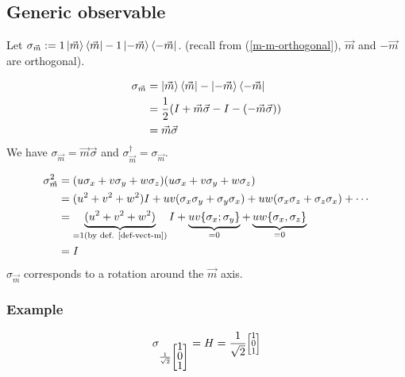 \documentclass{article}
\newcommand{\colvec}[2][.8]{%
  \scalebox{#1}{%
    \renewcommand{\arraystretch}{.7}%
    $\begin{bmatrix}#2\end{bmatrix}$%
  } }
\begin{document}
\subsection{Generic observable}
Let
$\sigma_{\vec{m}}:=1\ket{\vec{m}}\bra{\vec{m}}-1\ket{-\vec{m}}\bra{-\vec{m}}$.
(recall from (\ref{m-m-orthogonal}), $\vec{m}$ and $-\vec{m}$ are orthogonal).

\begin{equation}
    \begin{aligned}
        \sigma_{\vec{m}}
            & = \ket{\vec{m}}\bra{\vec{m}}-\ket{-\vec{m}}\bra{-\vec{m}} \\
            & = \frac{1}{2}(I+\vec{m}\vec{\sigma}-I-(-\vec{m}\vec{\sigma})) \\
            & = \vec{m}\vec{\sigma}
    \end{aligned}
\end{equation}
\noindent
We have $\sigma_{\vec{m}}=\vec{m}\vec{\sigma}$ and
$\sigma_{\vec{m}}^\dagger=\sigma_{\vec{m}}$.

\begin{equation}
    \begin{aligned}
        \sigma_{\vec{m}}^2
            & = (u\sigma_x + v\sigma_y + w\sigma_z)(u\sigma_x + v\sigma_y + w\sigma_z) \\
            & = (u^2 + v^2 + w^2)I + uv (\sigma_x\sigma_y + \sigma_y\sigma_x) +
                uw (\sigma_x\sigma_z + \sigma_z\sigma_x) + \cdots \\
            & = \underbrace{(u^2 + v^2 + w^2)}_{=1 (\text{by def. \ref{def-vect-m}})}I +
                \underbrace{uv\{\sigma_x; \sigma_y\}}_{=0} + \underbrace{uw\{\sigma_x,
                \sigma_z\}}_{=0} \\
            & = I
    \end{aligned}
\end{equation}
$\sigma_{\vec{m}}$ corresponds to a rotation around the $\vec{m}$ axis.

\subsubsection*{Example}
\begin{equation}
\sigma_{\frac{1}{\sqrt{2}}\begin{bmatrix}1\\0\\1\end{bmatrix}} = H = \frac{1}{\sqrt{2}}
\colvec{1\\0\\1}
\end{equation}
\end{document}
